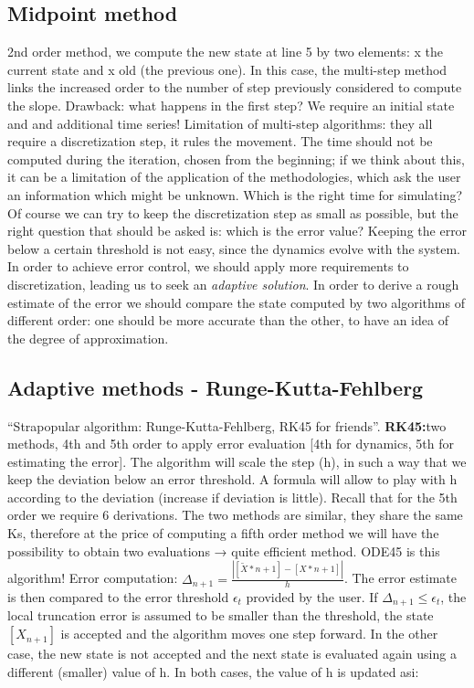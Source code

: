   \subsection{Midpoint method}
  2nd order method, we compute the new state at line 5 by two elements: x the current state and x old (the previous one).
  In this case, the multi-step method links the increased order to the number of step previously considered to compute the slope.
  Drawback: what happens in the first step? We require an initial state and and additional time series! Limitation of multi-step algorithms: they all require a discretization step, it rules the movement.
  The time should not be computed during the iteration, chosen from the beginning; if we think about this, it can be a limitation of the application of the methodologies, which ask the user an information which might be unknown.
  Which is the right time for simulating? Of course we can try to keep the discretization step as small as possible, but the right question that should be asked is: which is the error value? Keeping the error below a certain threshold is not easy, since the dynamics evolve with the system.
  In order to achieve error control, we should apply more requirements to discretization, leading us to seek an \emph{adaptive solution}.
  In order to derive a rough estimate of the error we should compare the state computed by two algorithms of different order: one should be more accurate than the other, to have an idea of the degree of approximation.

  \subsection{Adaptive methods - Runge-Kutta-Fehlberg}
  ``Strapopular algorithm: Runge-Kutta-Fehlberg, RK45 for friends''.
  \textbf{RK45:}two methods, 4th and 5th order to apply error evaluation {[}4th for dynamics, 5th for estimating the error{]}.
  The algorithm will scale the step (h), in such a way that we keep the deviation below an error threshold.
  A formula will allow to play with h according to the deviation (increase if deviation is little).
  Recall that for the 5th order we require 6 derivations.
  The two methods are similar, they share the same Ks, therefore at the price of computing a fifth order method we will have the possibility to obtain two evaluations → quite efficient method.
  ODE45 is this algorithm! Error computation: $\Delta_{n+1}=\frac{|[\tilde{X}*{n+1}]-[X*{n+1}]|}{h}$.
  The error estimate is then compared to the error threshold $\epsilon_t$ provided by the user.
  If $\Delta_{n+1}\leq \epsilon_t$, the local truncation error is assumed to be smaller than the threshold, the state $[X_{n+1}]$ is accepted and the algorithm moves one step forward.
  In the other case, the new state is not accepted and the next state is evaluated again using a different (smaller) value of h.
  In both cases, the value of h is updated asi:

